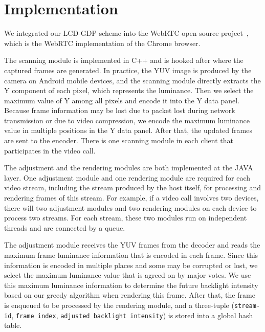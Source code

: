 \section{Implementation}
\label{sec:implementation}



We integrated our LCD-GDP scheme into the WebRTC open
source project~\cite{webrtcproject}, which is the WebRTC implementation of the Chrome
browser. 

The scanning module is implemented in C++ and is hooked after
where the captured frames are generated.  In practice, the YUV image
is produced by the camera on Android mobile devices, and the scanning
module directly extracts the Y component of each pixel, which represents
the luminance. Then we select the maximum value of Y among all pixels and encode it into the Y data
panel. 
Because frame information may be lost due to packet lost during network transmission 
or due to video compression, we encode the maximum luminance value in multiple positions in the Y data panel. 
After that, the updated frames are sent
to the encoder. There is one scanning module in each client that participates in the video call.

The adjustment and the rendering modules are both
implemented at the JAVA layer.
One adjustment module and one rendering module are required for each video stream,
including the stream produced by the host itself, for processing and rendering frames of this stream.
For example, if a video call involves two devices, there will two adjustment modules and two
rendering modules on each device to process two streams. 
For each stream, these two modules run on independent threads and are connected by a queue. 

The adjustment module receives the YUV frames from the decoder and 
reads the maximum frame luminance information that is encoded in each frame.
Since this information is encoded in multiple places and some may be corrupted or lost,
we select the maximum luminance value that is agreed on by major votes.
We use this maximum luminance information to determine the future backlight intensity 
based on our greedy algorithm when rendering this frame.
After that, the frame is enqueued to be processed by the rendering module, 
and a three-tuple ({\tt stream-id}, {\tt frame index}, 
{\tt adjusted backlight intensity}) is stored into a global hash
table. 

